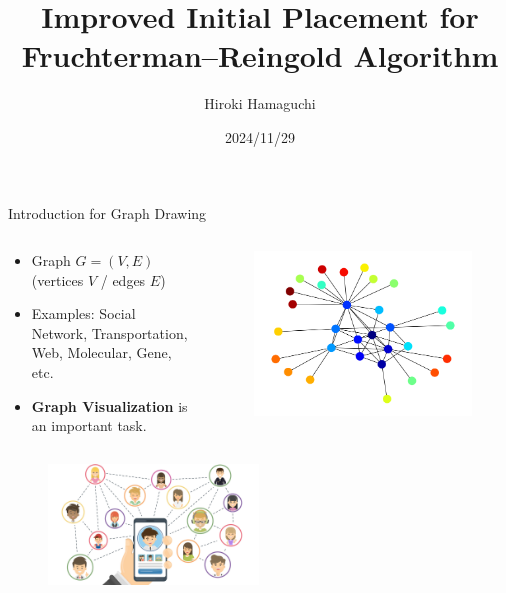 \documentclass[13pt,aspectratio=169,table,dvipdfmx]{beamer}
\title{\Huge{Improved Initial Placement for\\Fruchterman--Reingold Algorithm}}
\author{\Large{Hiroki Hamaguchi}}
\institute{\large{Supervisors: Prof. Akiko Takeda}}
\date{2024/11/29}
\newif\ifShowHidden
\begin{document}
\ifShowHidden
    \maketitle
\fi

\begin{frame}{Introduction for Graph Drawing}
    \begin{columns}
        \begin{column}{0.59\columnwidth}
            \begin{itemize}
                \item Graph $G = (V,E)$ (vertices $V$  / edges $E$)
                \item Examples: Social Network, Transportation, Web, Molecular, Gene, etc.
                \item \textbf{Graph Visualization} is an important task.
            \end{itemize}
        \end{column}
        \begin{column}{0.39\columnwidth}
            \begin{figure}[htbp]
                \centering
                \includegraphics[width=0.75\columnwidth]{imgs/example_fr.png}
            \end{figure}
        \end{column}
    \end{columns}
    \begin{figure}[htbp]
        \begin{minipage}{0.49\columnwidth}
            \centering
            \includegraphics[height=32mm]{imgs/graph_social.jpg}

\end{minipage}
\end{figure}
\end{frame}
\end{document}
